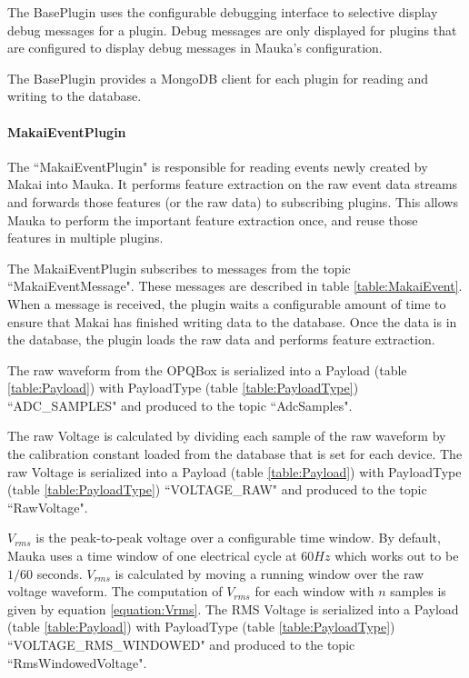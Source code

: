 The BasePlugin uses the configurable debugging interface to selective display debug messages for a plugin. Debug messages are only displayed for plugins that are configured to display debug messages in Mauka's configuration.

The BasePlugin provides a MongoDB client for each plugin for reading and writing to the database.

\paragraph{MakaiEventPlugin} The ``MakaiEventPlugin" is responsible for reading events newly created by Makai into Mauka. It performs feature extraction on the raw event data streams and forwards those features (or the raw data) to subscribing plugins. This allows Mauka to perform the important feature extraction once, and reuse those features in multiple plugins.

The MakaiEventPlugin subscribes to messages from the topic ``MakaiEventMessage". These messages are described in table \ref{table:MakaiEvent}. When a message is received, the plugin waits a configurable amount of time to ensure that Makai has finished writing data to the database. Once the data is in the database, the plugin loads the raw data and performs feature extraction.

The raw waveform from the OPQBox is serialized into a Payload (table \ref{table:Payload}) with PayloadType (table \ref{table:PayloadType}) ``ADC\_SAMPLES" and produced to the topic ``AdcSamples".

The raw Voltage is calculated by dividing each sample of the raw waveform by the calibration constant loaded from the database that is set for each device. The raw Voltage  is serialized into a Payload (table \ref{table:Payload}) with PayloadType (table \ref{table:PayloadType}) ``VOLTAGE\_RAW" and produced to the topic ``RawVoltage".

$V_{rms}$ is the peak-to-peak voltage over a configurable time window. By default, Mauka uses a time window of one electrical cycle at 60$Hz$ which works out to be $1/60$ seconds. $V_{rms}$ is calculated by moving a running window over the raw voltage waveform. The computation of $V_{rms}$ for each window with $n$ samples is given by equation \ref{equation:Vrms}. The RMS Voltage  is serialized into a Payload (table \ref{table:Payload}) with PayloadType (table \ref{table:PayloadType}) ``VOLTAGE\_RMS\_WINDOWED" and produced to the topic ``RmsWindowedVoltage".

